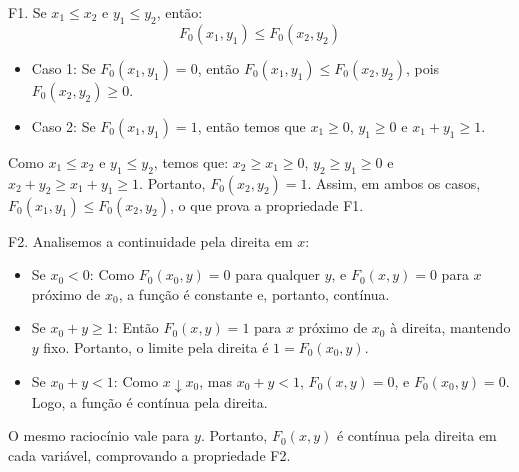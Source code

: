 \begin{frame}
F1. Se \( x_1 \leq x_2 \) e \( y_1 \leq y_2 \), então:
\[
F_0(x_1, y_1) \leq F_0(x_2, y_2)
\]	
\begin{itemize}
\item Caso 1: Se \( F_0(x_1, y_1) = 0 \), então \( F_0(x_1, y_1) \leq F_0(x_2, y_2) \), pois \( F_0(x_2, y_2) \geq 0 \).
\item Caso 2:  Se \( F_0(x_1, y_1) = 1 \), então temos que \( x_1 \geq 0 \), \( y_1 \geq 0 \) e \( x_1 + y_1 \geq 1 \).
\end{itemize}
Como \( x_1 \leq x_2 \) e \( y_1 \leq y_2 \), temos que: \( x_2 \geq x_1 \geq 0 \), \( y_2 \geq y_1 \geq 0 \) 
e \( x_2 + y_2 \geq x_1 + y_1 \geq 1 \). Portanto, \( F_0(x_2, y_2) = 1 \). 
Assim, em ambos os casos, \( F_0(x_1, y_1) \leq F_0(x_2, y_2) \), o que prova a propriedade F1.

\bigskip
F2. Analisemos a continuidade pela direita em \( x \):

\begin{itemize}
\item Se \( x_0 < 0 \): Como \( F_0(x_0, y) = 0 \) para qualquer \( y \), e \( F_0(x, y) = 0 \) para \( x \) próximo de \( x_0 \), a função é constante e, portanto, contínua.

\item Se \( x_0 + y \geq 1 \): Então \( F_0(x, y) = 1 \) para \( x \) próximo de \( x_0 \) à direita, mantendo \( y \) fixo. Portanto, o limite pela direita é \( 1 = F_0(x_0, y) \).

\item Se \( x_0 + y < 1 \): Como \( x \downarrow x_0 \), mas \( x_0 + y < 1 \), \( F_0(x, y) = 0 \), e \( F_0(x_0, y) = 0 \). Logo, a função é contínua pela direita.
\end{itemize}
O mesmo raciocínio vale para \( y \). Portanto, \( F_0(x, y) \) é contínua pela direita em cada variável, comprovando a propriedade F2.
	
\end{frame}	

